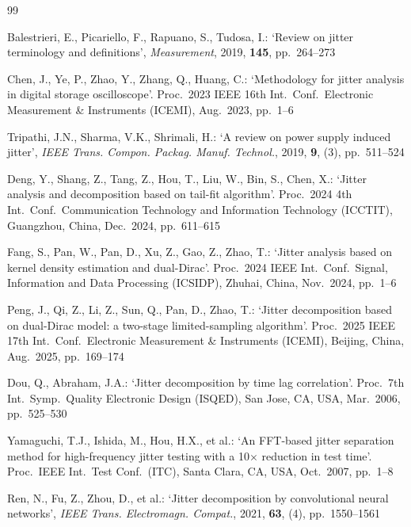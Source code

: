 \documentclass[10pt, a4paper, twocolumn]{article}
\begin{document}
\begin{thebibliography}{99}

 Balestrieri, E., Picariello, F., Rapuano, S., Tudosa, I.: `Review on jitter terminology and definitions', \textit{Measurement}, 2019, \textbf{145}, pp.~264--273

 Chen, J., Ye, P., Zhao, Y., Zhang, Q., Huang, C.: `Methodology for jitter analysis in digital storage oscilloscope'. Proc.\ 2023 IEEE 16th Int.\ Conf.\ Electronic Measurement \& Instruments (ICEMI), Aug.\ 2023, pp.~1--6

 Tripathi, J.N., Sharma, V.K., Shrimali, H.: `A review on power supply induced jitter', \textit{IEEE Trans. Compon. Packag. Manuf. Technol.}, 2019, \textbf{9}, (3), pp.~511--524

 Deng, Y., Shang, Z., Tang, Z., Hou, T., Liu, W., Bin, S., Chen, X.: `Jitter analysis and decomposition based on tail-fit algorithm'. Proc.\ 2024 4th Int.\ Conf.\ Communication Technology and Information Technology (ICCTIT), Guangzhou, China, Dec.\ 2024, pp.~611--615

 Fang, S., Pan, W., Pan, D., Xu, Z., Gao, Z., Zhao, T.: `Jitter analysis based on kernel density estimation and dual-Dirac'. Proc.\ 2024 IEEE Int.\ Conf.\ Signal, Information and Data Processing (ICSIDP), Zhuhai, China, Nov.\ 2024, pp.~1--6

 Peng, J., Qi, Z., Li, Z., Sun, Q., Pan, D., Zhao, T.: `Jitter decomposition based on dual-Dirac model: a two-stage limited-sampling algorithm'. Proc.\ 2025 IEEE 17th Int.\ Conf.\ Electronic Measurement \& Instruments (ICEMI), Beijing, China, Aug.\ 2025, pp.~169--174

 Dou, Q., Abraham, J.A.: `Jitter decomposition by time lag correlation'. Proc.\ 7th Int.\ Symp.\ Quality Electronic Design (ISQED), San Jose, CA, USA, Mar.\ 2006, pp.~525--530

 Yamaguchi, T.J., Ishida, M., Hou, H.X., et al.: `An FFT-based jitter separation method for high-frequency jitter testing with a 10$\times$ reduction in test time'. Proc.\ IEEE Int.\ Test Conf.\ (ITC), Santa Clara, CA, USA, Oct.\ 2007, pp.~1--8

 Ren, N., Fu, Z., Zhou, D., et al.: `Jitter decomposition by convolutional neural networks', \textit{IEEE Trans. Electromagn. Compat.}, 2021, \textbf{63}, (4), pp.~1550--1561


\end{thebibliography}
\end{document}
